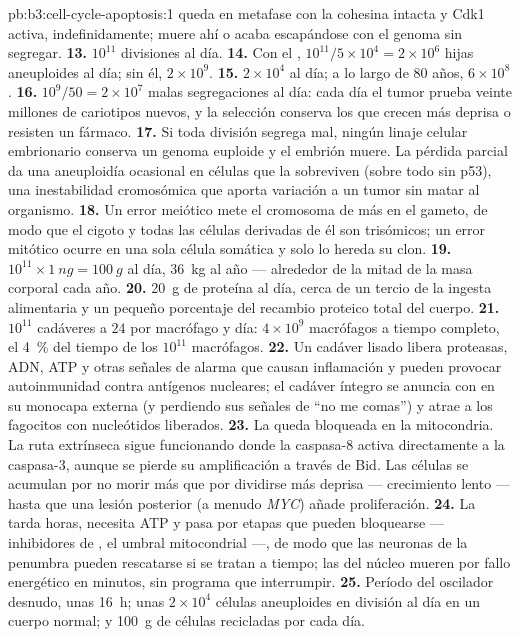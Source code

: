 \begin{solution}{pb:b3:cell-cycle-apoptosis:1}
queda en metafase con la cohesina intacta y Cdk1 activa, indefinidamente;
muere ahí o acaba escapándose con el genoma sin segregar.
\textbf{13.} $10^{11}$ divisiones al día.
\textbf{14.} Con el ,
$10^{11}/5\times 10^{4} = 2\times 10^{6}$ hijas aneuploides al día; sin
él, $2\times 10^{9}$.
\textbf{15.} $2\times 10^{4}$ al día; a lo largo de $80$ años,
$6\times 10^{8}$.
\textbf{16.} $10^{9}/50 = 2\times 10^{7}$ malas segregaciones al día:
cada día el tumor prueba veinte millones de cariotipos nuevos, y la
selección conserva los que crecen más deprisa o resisten un fármaco.
\textbf{17.} Si toda división segrega mal, ningún linaje celular
embrionario conserva un genoma euploide y el embrión muere. La pérdida
parcial da una aneuploidía ocasional en células que la sobreviven (sobre
todo sin p53), una inestabilidad cromosómica que aporta variación a un
tumor sin matar al organismo.
\textbf{18.} Un error meiótico mete el cromosoma de más en el gameto, de
modo que el cigoto y todas las células derivadas de él son trisómicos; un
error mitótico ocurre en una sola célula somática y solo lo hereda su
clon.
\textbf{19.} $10^{11}\times \qty{1}{ng} = \qty{100}{g}$ al día,
\qty{36}{kg} al año --- alrededor de la mitad de la masa corporal cada
año.
\textbf{20.} \qty{20}{g} de proteína al día, cerca de un tercio de la
ingesta alimentaria y un pequeño porcentaje del recambio proteico total
del cuerpo.
\textbf{21.} $10^{11}$ cadáveres a $24$ por macrófago y día: $4\times
10^{9}$ macrófagos a tiempo completo, el \qty{4}{\%} del tiempo de los
$10^{11}$ macrófagos.
\textbf{22.} Un cadáver lisado libera proteasas, ADN, ATP y otras señales
de alarma que causan inflamación y pueden provocar autoinmunidad contra
antígenos nucleares; el cadáver íntegro se anuncia con 
en su monocapa externa (y perdiendo sus señales de ``no me comas'') y
atrae a los fagocitos con nucleótidos liberados.
\textbf{23.} La  queda bloqueada en la mitocondria. La ruta
extrínseca sigue funcionando donde la caspasa-8 activa directamente a la
caspasa-3, aunque se pierde su amplificación a través de Bid. Las células
se acumulan por no morir más que por dividirse más deprisa ---
crecimiento lento --- hasta que una lesión posterior (a menudo
\emph{MYC}) añade proliferación.
\textbf{24.} La  tarda horas, necesita ATP y pasa por etapas que
pueden bloquearse --- inhibidores de , el umbral mitocondrial
---, de modo que las neuronas de la penumbra pueden rescatarse si se
tratan a tiempo; las del núcleo mueren por fallo energético en minutos,
sin programa que interrumpir.
\textbf{25.} Período del oscilador desnudo, unas \qty{16}{h}; unas $2\times
10^{4}$ células aneuploides en división al día en un cuerpo normal; y
\qty{100}{g} de células recicladas por  cada día.
\end{solution}
